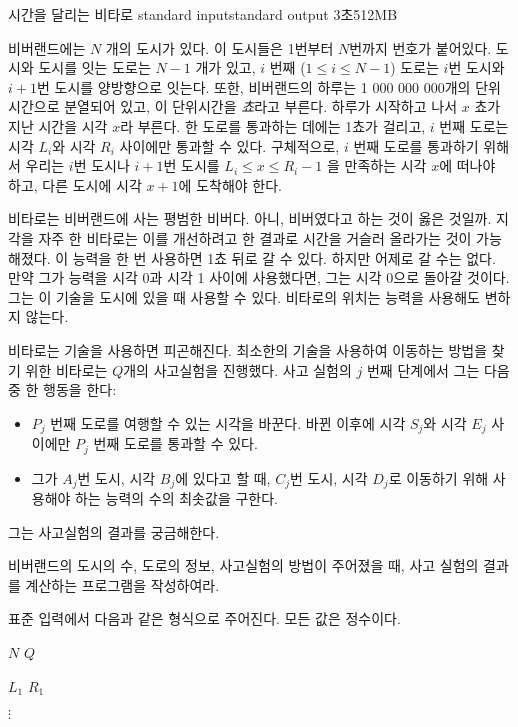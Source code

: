 \begin{problem}{시간을 달리는 비타로}
	{standard input}{standard output}
	{3초}{512MB}{}
	
	비버랜드에는 $N$ 개의 도시가 있다. 이 도시들은 1번부터 $N$번까지 번호가 붙어있다. 도시와 도시를 잇는 도로는 $N-1$ 개가 있고, $i$ 번째 ($1 \le i \le N-1$) 도로는 $i$번 도시와 $i+1$번 도시를 양방향으로 잇는다. 또한, 비버랜드의 하루는 1 000 000 000개의 단위시간으로 분열되어 있고, 이 단위시간을 \textit{쵸}라고 부른다. 하루가 시작하고 나서 $x$ 쵸가 지난 시간을 시각 $x$라 부른다. 한 도로를 통과하는 데에는 1쵸가 걸리고, $i$ 번째 도로는 시각 $L_i$와 시각 $R_i$  사이에만 통과할 수 있다. 구체적으로, $i$ 번째 도로를 통과하기 위해서 우리는 $i$번 도시나 $i+1$번 도시를 $L_i \le x \le R_i -1$ 을 만족하는 시각 $x$에 떠나야 하고, 다른 도시에 시각 $x+1$에 도착해야 한다.
	
	비타로는 비버랜드에 사는 평범한 비버다. 아니, 비버였다고 하는 것이 옳은 것일까. 지각을 자주 한 비타로는 이를 개선하려고 한 결과로 시간을 거슬러 올라가는 것이 가능해졌다. 이 능력을 한 번 사용하면 1쵸 뒤로 갈 수 있다. 하지만 어제로 갈 수는 없다. 만약 그가 능력을 시각 0과 시각 1 사이에 사용했다면, 그는 시각 0으로 돌아갈 것이다. 그는 이 기술을 도시에 있을 때 사용할 수 있다. 비타로의 위치는 능력을 사용해도 변하지 않는다.
	
	비타로는 기술을 사용하면 피곤해진다. 최소한의 기술을 사용하여 이동하는 방법을 찾기 위한 비타로는 $Q$개의 사고실험을 진행했다. 사고 실험의 $j$ 번째 단계에서 그는 다음 중 한 행동을 한다:
	
	\begin{itemize}
		\item $P_j$ 번째 도로를 여행할 수 있는 시각을 바꾼다. 바뀐 이후에 시각 $S_j$와 시각 $E_j$ 사이에만 $P_j$ 번째 도로를 통과할 수 있다.
		\item 그가 $A_j$번 도시, 시각 $B_j$에 있다고 할 때, $C_j$번 도시, 시각 $D_j$로 이동하기 위해 사용해야 하는 능력의 수의 최솟값을 구한다.
	\end{itemize}

	그는 사고실험의 결과를 궁금해한다.
	
	비버랜드의 도시의 수, 도로의 정보, 사고실험의 방법이 주어졌을 때, 사고 실험의 결과를 계산하는 프로그램을 작성하여라.
	
	
	\InputFile
	
	표준 입력에서 다음과 같은 형식으로 주어진다. 모든 값은 정수이다.
	
	$N$ $Q$
	
	$L_1$ $R_1$
	
	$\vdots$
	

\end{problem}
